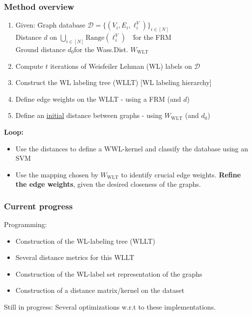 \begin{frame}
\frametitle{Method overview} \vspace{-1cm}
\begin{enumerate}
	\item \begin{tabbing}
		Given: \=Graph database $\mathcal{D}=\{ (V_i, E_i, \ell^V_i) \}_{i\in[N]}$\\
		\>Distance $d$ on $\bigcup_{i\in[N]}\text{Range}(\ell^V_i)$\ \ \=for the FRM\\
		\>Ground distance $d_0$\>for the Wass.Dist. $W_{\text{WLT}}$
	\end{tabbing}
	\item Compute $t$ iterations of Weisfeiler Lehman (WL) labels on $\mathcal{D}$
	\item Construct the WL labeling tree (WLLT) [WL labeling hierarchy]
	\item Define edge weights on the WLLT - using a FRM (and $d$)		
	\item Define an \underline{initial} distance between graphs - using $W_{\text{WLT}}$ (and $d_0$)
\end{enumerate}
\textbf{Loop:}
\begin{itemize}		
	\item Use the distances to define a WWL-kernel and classify the database using an SVM
	\item Use the mapping chosen by $W_{\text{WLT}}$ to identify crucial edge weights. \textbf{Refine the edge weights}, given the desired closeness of the graphs.
\end{itemize}
\end{frame}

\begin{frame}
\frametitle{Current progress}
	Programming:
	\begin{itemize}
		\item Construction of the WL-labeling tree (WLLT) \newline
		\item Several distance metrics for this WLLT \newline
		\item Construction of the WL-label set representation of the graphs \newline
		\item Construction of a distance matrix/kernel on the dataset\newline
	\end{itemize}	
	Still in progress: Several optimizations w.r.t to these implementations.
\end{frame}

